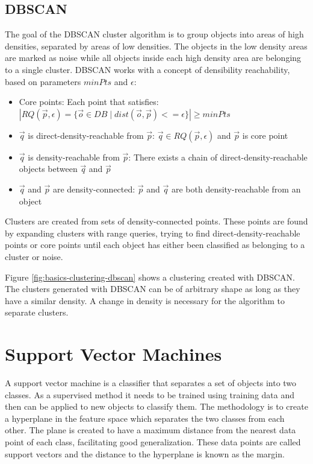 \documentclass[pdftex,12pt,a4paper]{report}
\begin{document}
\subsection{DBSCAN}

The goal of the DBSCAN cluster algorithm is to group objects into areas of high densities, separated by areas of low densities. The objects in the low density areas are marked as noise while all objects inside each high density area are belonging to a single cluster. DBSCAN works with a concept of densibility reachability, based on parameters $minPts$ and $\epsilon$:

\begin{itemize}
	\item
	Core points: Each point that satisfies: \\$|RQ(\vec{p}, \epsilon) = \{  \vec{o} \in DB \mid dist(\vec{o},\vec{p}) <= \epsilon  \}| \geq minPts$
	
	 \item
	 $\vec{q}$ is direct-density-reachable from $\vec{p}$: $\vec{q} \in RQ(\vec{p}, \epsilon)$ and $\vec{p}$ is core point
	 
	 \item
	 $\vec{q}$ is density-reachable from $\vec{p}$: There exists a chain of direct-density-reachable objects between $\vec{q}$ and $\vec{p}$
	 
	 \item
	 $\vec{q}$ and $\vec{p}$ are density-connected: $\vec{p}$ and $\vec{q}$ are both density-reachable from an object
\end{itemize}

Clusters are created from sets of density-connected points. These points are found by expanding clusters with range queries, trying to find direct-density-reachable points or core points until each object has either been classified as belonging to a cluster or noise.

Figure \ref{fig:basics-clustering-dbscan} shows a clustering created with DBSCAN. The clusters generated with DBSCAN can be of arbitrary shape as long as they have a similar density. A change in density is necessary for the algorithm to separate clusters. 

\section{Support Vector Machines}

A support vector machine is a classifier that separates a set of objects into two classes. As a supervised method it needs to be trained using training data and then can be applied to new objects to classify them. The methodology is to create a hyperplane in the feature space which separates the two classes from each other. The plane is created to have a maximum distance from the nearest data point of each class, facilitating good generalization. These data points are called support vectors and the distance to the hyperplane is known as the margin.
\end{document}

